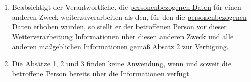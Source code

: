 \begin{enumerate}
\begin{enumerate}
  \end{enumerate}

  \item Beabsichtigt der Verantwortliche, die \hyperref[itm:04-1]{personenbezogenen Daten} für einen anderen Zweck weiterzuverarbeiten als
   den, für den die \hyperref[itm:04-1]{personenbezogenen Daten} erhoben wurden, so stellt er der \hyperref[itm:04-1]{betroffenen Person} vor dieser
   Weiterverarbeitung Informationen über diesen anderen Zweck und alle anderen maßgeblichen Informationen gemäß
   \hyperref[itm:13-2]{Absatz 2} zur Verfügung.
  \label{itm:13-3}  

  \item Die Absätze \hyperref[itm:13-1]{1}, \hyperref[itm:13-2]{2} und \hyperref[itm:13-3]{3} finden keine Anwendung,
   wenn und soweit die \hyperref[itm:04-1]{betroffene Person} bereits über die Informationen verfügt.
  \label{itm:13-4}  

\end{enumerate}


